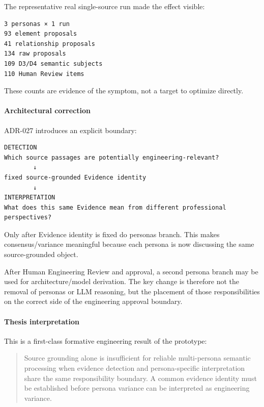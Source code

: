 The representative real single-source run made the effect visible:

\begin{verbatim}
3 personas × 1 run
93 element proposals
41 relationship proposals
134 raw proposals
109 D3/D4 semantic subjects
110 Human Review items
\end{verbatim}

These counts are evidence of the symptom, not a target to optimize directly.

\hypertarget{architectural-correction}{%
\paragraph{Architectural correction}\label{architectural-correction}}

ADR-027 introduces an explicit boundary:

\begin{verbatim}
DETECTION
Which source passages are potentially engineering-relevant?
        ↓
fixed source-grounded Evidence identity
        ↓
INTERPRETATION
What does this same Evidence mean from different professional perspectives?
\end{verbatim}

Only after Evidence identity is fixed do personas branch. This makes consensus/variance meaningful because each persona is now discussing the same source-grounded object.

After Human Engineering Review and approval, a second persona branch may be used for architecture/model derivation. The key change is therefore not the removal of personas or LLM reasoning, but the placement of those responsibilities on the correct side of the engineering approval boundary.

\hypertarget{thesis-interpretation}{%
\paragraph{Thesis interpretation}\label{thesis-interpretation}}

This is a first-class formative engineering result of the prototype:

\begin{quote}
Source grounding alone is insufficient for reliable multi-persona semantic processing when evidence detection and persona-specific interpretation share the same responsibility boundary. A common evidence identity must be established before persona variance can be interpreted as engineering variance.
\end{quote}

